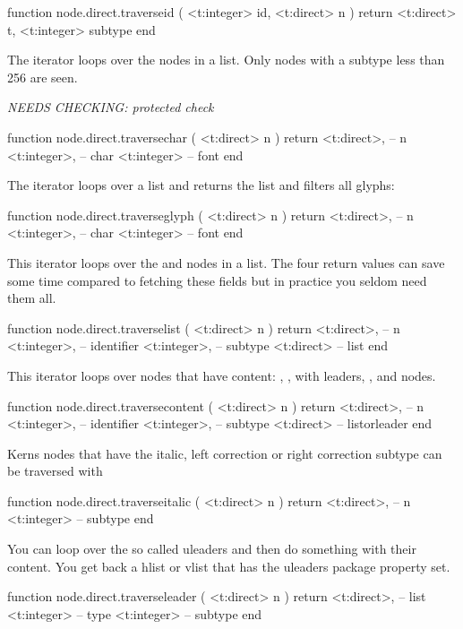 \starttyping[option=LUA]
function node.direct.traverseid ( <t:integer> id, <t:direct> n )
    return
        <t:direct>  t,
        <t:integer> subtype
end
\stoptyping

The  iterator loops over the  nodes in a list.
Only nodes with a subtype less than 256 are seen.

{\em NEEDS CHECKING: protected check}

\starttyping[option=LUA]
function node.direct.traversechar ( <t:direct> n )
    return
        <t:direct>,  -- n
        <t:integer>, -- char
        <t:integer>  -- font
end
\stoptyping

The  iterator loops over a list and returns the list and
filters all glyphs:

\starttyping[option=LUA]
function node.direct.traverseglyph ( <t:direct> n )
    return
        <t:direct>,  -- n
        <t:integer>, -- char
        <t:integer>  -- font
end
\stoptyping

This iterator loops over the  and  nodes in a list. The
four return values can save some time compared to fetching these fields but in
practice you seldom need them all.

\starttyping[option=LUA]
function node.direct.traverselist ( <t:direct> n )
    return
        <t:direct>,  -- n
        <t:integer>, -- identifier
        <t:integer>, -- subtype
        <t:direct>   -- list
end
\stoptyping

This iterator loops over nodes that have content: , ,
 with leaders, ,  and  nodes.

\starttyping[option=LUA]
function node.direct.traversecontent ( <t:direct> n )
    return
        <t:direct>,  -- n
        <t:integer>, -- identifier
        <t:integer>, -- subtype
        <t:direct>   -- listorleader
end
\stoptyping

Kerns nodes that have the italic, left correction or right correction subtype can
be traversed with

\starttyping[option=LUA]
function node.direct.traverseitalic ( <t:direct> n )
    return
        <t:direct>, -- n
        <t:integer> -- subtype
end
\stoptyping

You can loop over the so called uleaders and then do something with their
content. You get back a hlist or vlist that has the uleaders package property
set.

\starttyping[option=LUA]
function node.direct.traverseleader ( <t:direct> n )
    return
        <t:direct>, -- list
        <t:integer> -- type
        <t:integer> -- subtype
end
\stoptyping

